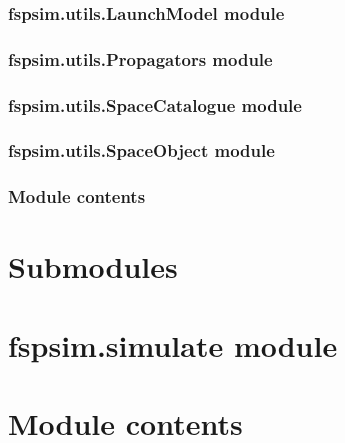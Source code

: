 \documentclass[letterpaper,10pt,english]{sphinxmanual}
\begin{document}
\subsubsection{fspsim.utils.LaunchModel module}
\label{\detokenize{fspsim.utils:fspsim-utils-launchmodel-module}}

\subsubsection{fspsim.utils.Propagators module}
\label{\detokenize{fspsim.utils:fspsim-utils-propagators-module}}

\subsubsection{fspsim.utils.SpaceCatalogue module}
\label{\detokenize{fspsim.utils:fspsim-utils-spacecatalogue-module}}

\subsubsection{fspsim.utils.SpaceObject module}
\label{\detokenize{fspsim.utils:fspsim-utils-spaceobject-module}}

\subsubsection{Module contents}
\label{\detokenize{fspsim.utils:module-fspsim.utils}}\label{\detokenize{fspsim.utils:module-contents}}

\section{Submodules}
\label{\detokenize{fspsim:submodules}}

\section{fspsim.simulate module}
\label{\detokenize{fspsim:fspsim-simulate-module}}

\section{Module contents}
\label{\detokenize{fspsim:module-fspsim}}\label{\detokenize{fspsim:module-contents}}
\end{document}
